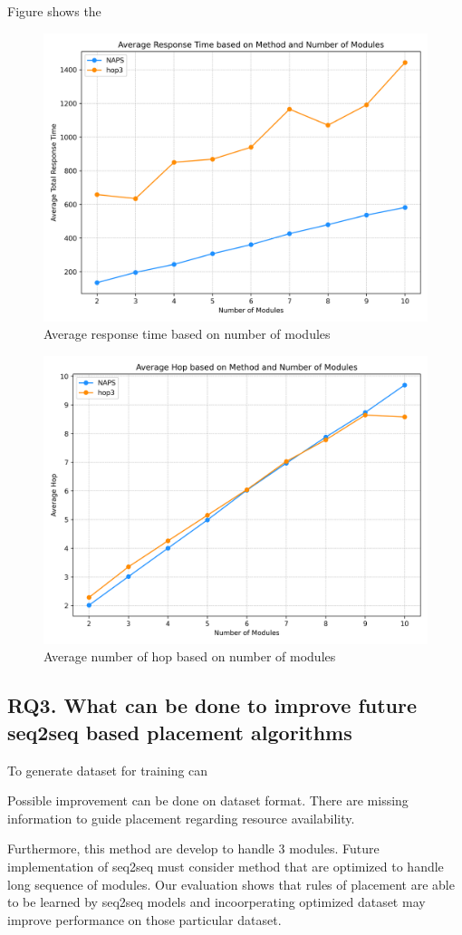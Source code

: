 \documentclass[conference]{IEEEtran}
\begin{document}
Figure shows the 

\begin{figure}[!h]
	\centering
	\includegraphics[width=.48\textwidth]{fig/numberofmodulexresponsetime.png}
	\caption{Average response time based on number of modules}
	\label{fig:Avgresponsexnumba_module}
\end{figure}


\begin{figure}[!h]
	\centering
	\includegraphics[width=.48\textwidth]{fig/hopxnumberofmodule.png}
	\caption{Average number of hop based on number of modules}
	\label{fig:hopxnumbaofmodule}
\end{figure}

\subsection*{RQ3. What can be done to improve future seq2seq based placement algorithms}

To generate dataset for training can 

Possible improvement can be done on dataset format. There are missing information to guide placement regarding resource availability. 

Furthermore, this method are develop to handle 3 modules. Future implementation of seq2seq must consider method that are optimized to handle long sequence of modules. Our evaluation shows that rules of placement are able to be learned by seq2seq models and incoorperating optimized dataset may improve performance on those particular dataset.
\end{document}

